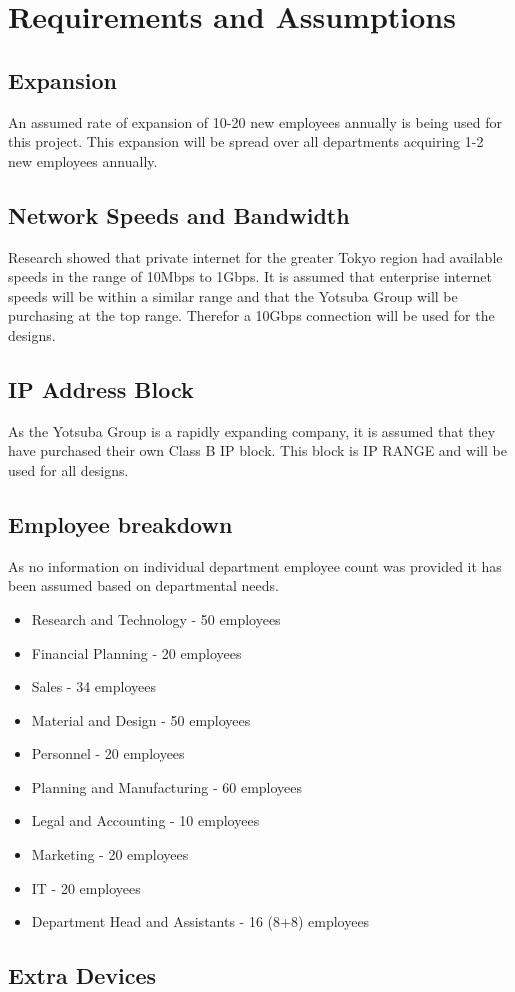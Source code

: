 \chapter{Requirements and Assumptions}

\section{Expansion}
An assumed rate of expansion of 10-20 new employees annually is being used for this project. This expansion will be spread over all departments acquiring 1-2 new employees annually.
\section{Network Speeds and Bandwidth}
Research showed that private internet for the greater Tokyo region had available speeds in the range of 10Mbps to 1Gbps. It is assumed that enterprise internet speeds will be within a similar range and that the Yotsuba Group will be purchasing at the top range. Therefor a 10Gbps connection will be used for the designs.
\section{IP Address Block}
As the Yotsuba Group is a rapidly expanding company, it is assumed that they have purchased their own Class B IP block. This block is IP RANGE and will be used for all designs.
\section{Employee breakdown}
As no information on individual department employee count was provided it has been assumed based on departmental needs.
\begin{itemize}
    \item Research and Technology - 50 employees
    \item Financial Planning - 20 employees
    \item Sales - 34 employees
    \item Material and Design - 50 employees
    \item Personnel - 20 employees
    \item Planning and Manufacturing - 60 employees
    \item Legal and Accounting - 10 employees
    \item Marketing - 20 employees
    \item IT - 20 employees
    \item Department Head and Assistants - 16 (8+8) employees
\end{itemize}
\section{Extra Devices}
